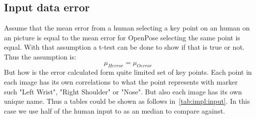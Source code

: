 \subsection{Input data error}\label{sub:implment:inputerror}
Assume that the mean error from a human selecting a key point on an human on an picture is equal to the mean error for OpenPose selecting the same point is equal.
With that assumption a t-test can be done to show if that is true or not.
Thus the assumption is:
\[
    \mu_{Herror} = \mu_{Oerror}
\]
But how is the error calculated form quite limited set of key points.
Each point in each image has its own correlations to what the point represents with marker such "Left Wrist", "Right Shoulder" or "Nose".
But also each image has its own unique name.
Thus a tables could be shown as follows in~\ref{tab:impl:input}.
In this case we use half of the human input to as an median to compare against.
